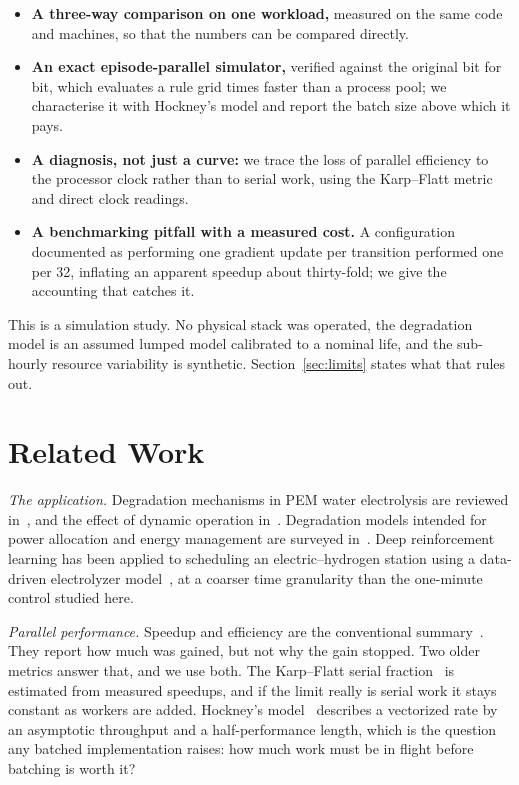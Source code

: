 \documentclass[conference]{IEEEtran}
\begin{document}
\begin{itemize}
  \item \textbf{A three-way comparison on one workload,} measured on the same code and machines, so that the
        numbers can be compared directly.
  \item \textbf{An exact episode-parallel simulator,} verified against the original bit for bit, which evaluates a
        rule grid \NumBatchGridSpeedup{} times faster than a process pool; we characterise it with Hockney's model
        and report the batch size above which it pays.
  \item \textbf{A diagnosis, not just a curve:} we trace the loss of parallel efficiency to the processor clock
        rather than to serial work, using the Karp--Flatt metric and direct clock readings.
  \item \textbf{A benchmarking pitfall with a measured cost.} A configuration documented as performing one gradient
        update per transition performed one per 32, inflating an apparent speedup about thirty-fold; we give the
        accounting that catches it.
\end{itemize}

This is a simulation study. No physical stack was operated, the degradation model is an assumed lumped model
calibrated to a nominal life, and the sub-hourly resource variability is synthetic. Section~\ref{sec:limits} states
what that rules out.

\section{Related Work}
\emph{The application.} Degradation mechanisms in PEM water electrolysis are reviewed
in~\cite{feng2017pemwe,bernhardt2026degradation}, and the effect of dynamic operation
in~\cite{sayedahmed2024dynamic}. Degradation models intended for power allocation and energy management are
surveyed in~\cite{degmodels2025}. Deep reinforcement learning has been applied to scheduling an
electric--hydrogen station using a data-driven electrolyzer model~\cite{drl_scheduling_2026}, at a coarser time
granularity than the one-minute control studied here.

\emph{Parallel performance.} Speedup and efficiency are the conventional
summary~\cite{amdahl1967,gustafson1988}. They report how much was gained, but not why the gain stopped. Two older
metrics answer that, and we use both. The Karp--Flatt serial fraction~\cite{karpflatt1990} is estimated from
measured speedups, and if the limit really is serial work it stays constant as workers are added. Hockney's
model~\cite{hockney1991} describes a vectorized rate by an asymptotic throughput and a half-performance length,
which is the question any batched implementation raises: how much work must be in flight before batching is worth
it?
\end{document}
